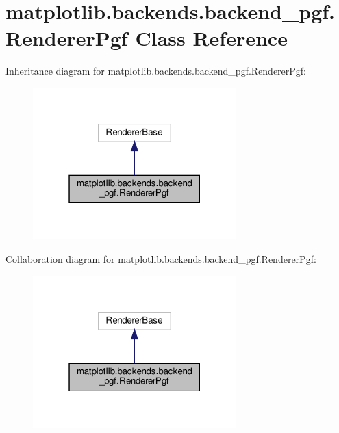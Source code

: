\hypertarget{classmatplotlib_1_1backends_1_1backend__pgf_1_1RendererPgf}{}\section{matplotlib.\+backends.\+backend\+\_\+pgf.\+Renderer\+Pgf Class Reference}
\label{classmatplotlib_1_1backends_1_1backend__pgf_1_1RendererPgf}


Inheritance diagram for matplotlib.\+backends.\+backend\+\_\+pgf.\+Renderer\+Pgf\+:
\nopagebreak
\begin{figure}[H]
\begin{center}
\leavevmode
\includegraphics[width=223pt]{classmatplotlib_1_1backends_1_1backend__pgf_1_1RendererPgf__inherit__graph}
\end{center}
\end{figure}


Collaboration diagram for matplotlib.\+backends.\+backend\+\_\+pgf.\+Renderer\+Pgf\+:
\nopagebreak
\begin{figure}[H]
\begin{center}
\leavevmode
\includegraphics[width=223pt]{classmatplotlib_1_1backends_1_1backend__pgf_1_1RendererPgf__coll__graph}
\end{center}
\end{figure}
